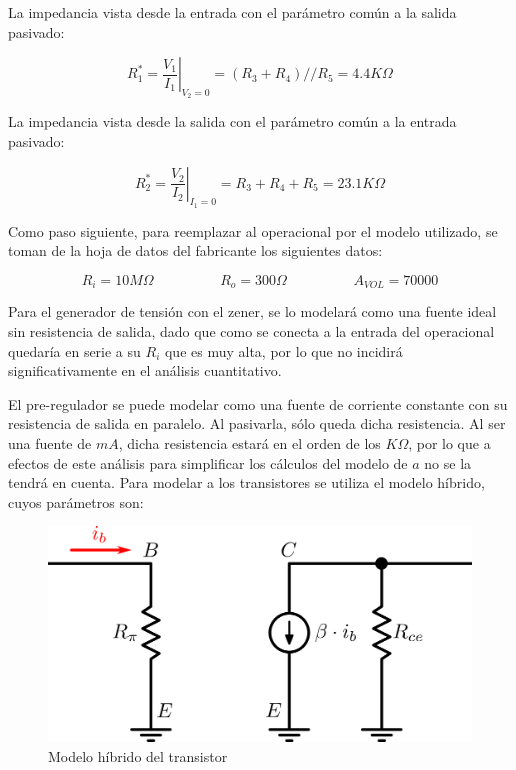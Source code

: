 La impedancia vista desde la entrada con el par\'ametro com\'un a la salida pasivado:

\[
R^*_1 = \left. \frac{V_1}{I_1} \right|_{V_2=0} = (R_3+R_4) // R_5 = 4.4K\Omega
\]

La impedancia vista desde la salida con el par\'ametro com\'un a la entrada pasivado:

\[
R^*_2 = \left. \frac{V_2}{I_2} \right|_{I_1=0} = R_3 + R_4 + R_5 = 23.1K\Omega
\]

Como paso siguiente, para reemplazar al operacional por el modelo utilizado, se toman de la hoja de datos del fabricante los siguientes datos:

\[
R_i = 10M\Omega \hspace{2cm} R_o = 300\Omega \hspace{2cm} A_{VOL} = 70000
\]

Para el generador de tensi\'on con el zener, se lo modelar\'a como una fuente ideal sin resistencia de salida, dado que como se conecta a la entrada del operacional quedar\'ia en serie a su $R_i$ que es muy alta, por lo que no incidir\'a significativamente en el an\'alisis cuantitativo.\par
El pre-regulador se puede modelar como una fuente de corriente constante con su resistencia de salida en paralelo. Al pasivarla, s\'olo queda dicha resistencia. Al ser una fuente de $mA$, dicha resistencia estar\'a en el orden de los $K\Omega$, por lo que a efectos de este an\'alisis para simplificar los c\'alculos del modelo de $a$ no se la tendr\'a en cuenta.
Para modelar a los transistores se utiliza el modelo h\'ibrido, cuyos par\'ametros son:

\begin{figure}[!ht]
\begin{centering}
\includegraphics[scale=0.5]{Imagenes/ModeloPi.png}
\par\end{centering}
\caption{Modelo h\'ibrido del transistor}

\end{figure}

